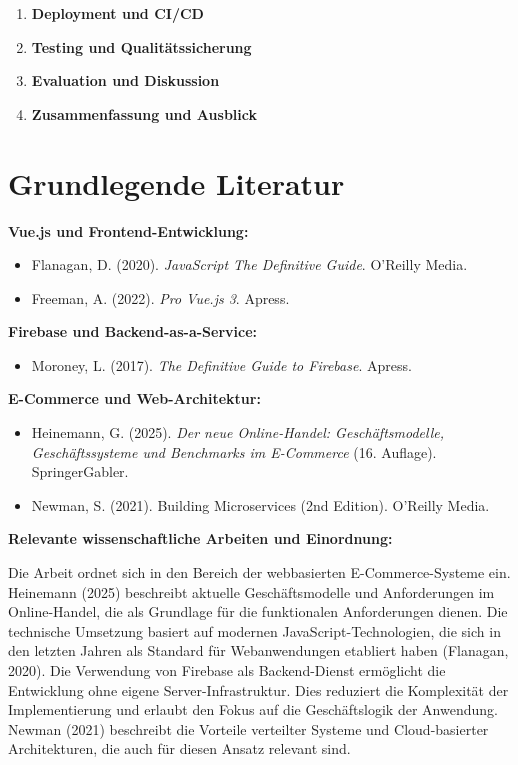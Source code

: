\documentclass{scrartcl}
\begin{document}
\begin{enumerate}
    \item \textbf{Deployment und CI/CD}
    
    \item \textbf{Testing und Qualitätssicherung}
    
    \item \textbf{Evaluation und Diskussion}
    
    \item \textbf{Zusammenfassung und Ausblick}
\end{enumerate}

\section{Grundlegende Literatur}
\textbf{Vue.js und Frontend-Entwicklung:}
\begin{itemize}
    \item Flanagan, D. (2020). \textit{JavaScript The Definitive Guide}. O'Reilly Media.
    \item Freeman, A. (2022). \textit{Pro Vue.js 3}. Apress.
\end{itemize}

\textbf{Firebase und Backend-as-a-Service:}
\begin{itemize}
    \item Moroney, L. (2017). \textit{The Definitive Guide to Firebase}. Apress.
\end{itemize}

\textbf{E-Commerce und Web-Architektur:}
\begin{itemize}
    \item Heinemann, G. (2025). \textit{Der neue Online-Handel: Geschäftsmodelle, Geschäftssysteme und Benchmarks im E-Commerce} (16. Auflage). SpringerGabler.
    \item Newman, S. (2021). Building Microservices (2nd Edition). O'Reilly Media.
\end{itemize}

\noindent
\textbf{Relevante wissenschaftliche Arbeiten und Einordnung:}

\noindent
Die Arbeit ordnet sich in den Bereich der webbasierten E-Commerce-Systeme ein. Heinemann (2025) beschreibt aktuelle Geschäftsmodelle und Anforderungen im Online-Handel, die als Grundlage für die funktionalen Anforderungen dienen. Die technische Umsetzung basiert auf modernen JavaScript-Technologien, die sich in den letzten Jahren als Standard für Webanwendungen etabliert haben (Flanagan, 2020).
\newline\newline
Die Verwendung von Firebase als Backend-Dienst ermöglicht die Entwicklung ohne eigene Server-Infrastruktur. Dies reduziert die Komplexität der Implementierung und erlaubt den Fokus auf die Geschäftslogik der Anwendung. Newman (2021) beschreibt die Vorteile verteilter Systeme und Cloud-basierter Architekturen, die auch für diesen Ansatz relevant sind.\newline
\end{document}
